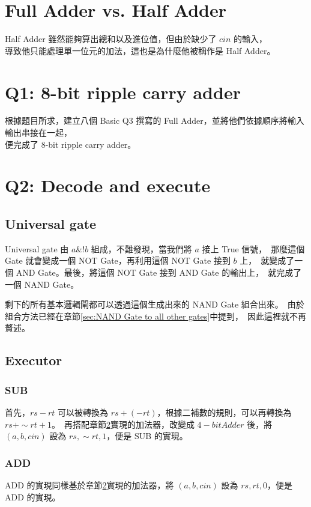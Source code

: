 \documentclass[10.5pt,compsoc,UTF8]{CjC}
\theoremstyle{mystyle}
\begin{document}
\section{Full Adder vs. Half Adder}

Half Adder 雖然能夠算出總和以及進位值，但由於缺少了 $cin$  的輸入，\\
導致他只能處理單一位元的加法，這也是為什麼他被稱作是 Half Adder。

\section{Q1: 8-bit ripple carry adder}
\label{sec:Q1}

根據題目所求，建立八個 Basic Q3 撰寫的 Full Adder，並將他們依據順序將輸入輸出串接在一起，\\
便完成了 8-bit ripple carry adder。

\section{Q2: Decode and execute}

\subsection{Universal gate}
Universal gate 由 $a \& !b$ 組成，不難發現，當我們將 $a$ 接上 True 信號，\
那麼這個 Gate 就會變成一個 NOT Gate，再利用這個 NOT Gate 接到 $b$ 上，\
就變成了一個 AND Gate。最後，將這個 NOT Gate 接到 AND Gate 的輸出上，\
就完成了一個 NAND Gate。

剩下的所有基本邏輯閘都可以透過這個生成出來的 NAND Gate 組合出來。\
由於組合方法已經在章節\ref{sec:NAND Gate to all other gates}中提到，\
因此這裡就不再贅述。

\subsection{Executor}
\subsubsection{SUB}
首先，$rs - rt$ 可以被轉換為 $rs + (-rt)$，根據二補數的規則，可以再轉換為 $rs + \sim rt + 1$。\
再搭配章節\ref{sec:Q1}實現的加法器，改變成 $4-bit Adder$ 後，將 $(a, b, cin)$ 設為 $rs, \sim rt, 1$，便是 SUB 的實現。

\subsubsection{ADD}
ADD 的實現同樣基於章節\ref{sec:Q1}實現的加法器，將 $(a, b, cin)$ 設為 $rs, rt, 0$，便是 ADD 的實現。
\end{document}
